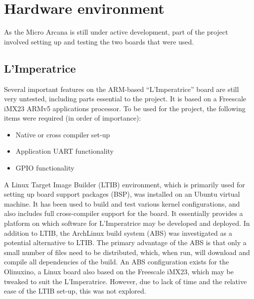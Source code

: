 




\section{Hardware environment} %
\label{sec:hardware_dev_env}
	As the Micro Arcana is still under active development, part of the project involved setting up and testing the two boards that were used.

	\subsection{L'Imperatrice} %
	\label{sub:l_imperatrice_env}
		Several important features on the ARM-based ``L'Imperatrice'' board are still very untested, including parts essential to the project.  It is based on a Freescale iMX23 ARMv5 applications processor.  To be used for the project, the following items were required (in order of importance):
		\begin{itemize}
			\item Native or cross compiler set-up
			\item Application UART functionality
			\item GPIO functionality
		\end{itemize}

		A Linux Target Image Builder (LTIB)  environment, which is primarily used for setting up board support packages (BSP), was installed on an Ubuntu virtual machine.  It has been used to build and test various kernel configurations, and also includes full cross-compiler support for the board.  It essentially provides a platform on which software for L'Imperatrice may be developed and deployed.
		In addition to LTIB, the ArchLinux build system (ABS) was investigated as a potential alternative to LTIB.  The primary advantage of the ABS is that only a small number of files need to be distributed, which, when run, will download and compile all dependencies of the build.  An ABS configuration exists for the Olinuxino, a Linux board also based on the Freescale iMX23, which may be tweaked to suit the L'Imperatrice.  However, due to lack of time and the relative ease of the LTIB set-up, this was not explored.

